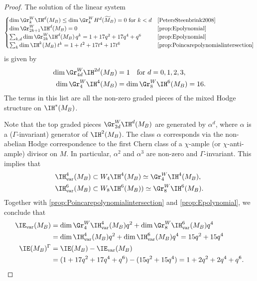 \begin{proof}
The solution of the linear system
\[
\begin{cases}
\dim\Gr^W_{k}\IH^d(M_B) \leq \dim\Gr^W_{k} H^{d}(\widetilde{M}_B)=0 \text{ for }k<d& \text{\cite[Prop.\,4.20]{PetersSteenbrink2008}}\\
\dim \Gr^W_{2k+1}\IH^d(M_B)=0 & \text{\cref{prop:Epolynomial}}\\
\sum_{k, d} \dim \Gr^W_{2k}\IH^d(M_B) \,q^{k} = 1+17q^2+17q^4+q^{6} & \text{\cref{prop:Epolynomial}}\\
\sum_k \dim \IH^k(M_B)\,t^k = 1+t^2+17t^4+17t^6 & \text{\cref{prop:Poincarepolynomialintersection}}
\end{cases}
\]
is given by
\begin{align}\label{gradingw2d}
\dim \Gr^W_{4d} \IH^{2d}(M_B) &= 1 \quad\text{for }d=0,1,2,3,
\\
\label{gradingw4}
\dim \Gr^W_{4} \IH^4(M_B) &= \dim \Gr^W_{8} \IH^6(M_B) = 16.
\end{align}
The terms in this list are all the non-zero graded pieces of the mixed Hodge structure on $\IH^*(M_B)$.

Note that the top graded pieces $\Gr^W_{2d} \IH^d(M_B)$ are generated by $\alpha^d$, where $\alpha$ is a ($\Gamma$-invariant) generator of $\IH^2(M_B)$. The class $\alpha$ corresponds via the non-abelian Hodge correspondence to the first Chern class of a $\chi$-ample (or $\chi$-anti-ample) divisor on $M$. In particular, $\alpha^2$ and $\alpha^3$ are non-zero and $\Gamma$-invariant.
This implies that
\begin{align*}
\IH_{\mathrm{var}}^{4}(M_B) &\subset W_4 \IH^{4}(M_B) \simeq \Gr^{W}_4 \IH^{4}(M_B),\\
\IH_{\mathrm{var}}^{6}(M_B) &\subset W_8 \IH^{6}(M_B)) \simeq \Gr^{W}_8 \IH^{6}(M_B).
\end{align*} Together with \cref{prop:Poincarepolynomialintersection} and \cref{prop:Epolynomial}, we conclude that
\begin{align*}
\IE_{\mathrm{var}}(M_B) & = \dim \Gr^{W}_4 \IH^{4}_{\mathrm{var}}(M_B) q^2 + \dim \Gr^{W}_8 \IH^{6}_{\mathrm{var}}(M_B) q^4\\
& = \dim \IH^{4}_{\mathrm{var}}(M_B) q^2 + \dim \IH^{6}_{\mathrm{var}}(M_B) q^4 = 15 q^2+15q^4\\
\IE(M_B)^{\Gamma} & = \IE(M_B)-\IE_{\mathrm{var}}(M_B)\\
& = (1+17q^2+17q^4+q^6) - (15 q^2+15q^4) = 1+2q^2+2q^4+q^6.\qedhere
\end{align*}
\end{proof}

